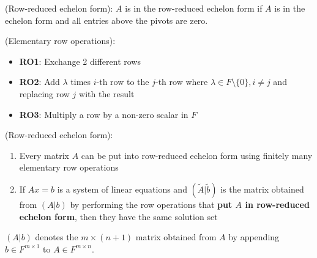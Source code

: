 \begin{definition}
(Row-reduced echelon form): $A$ is in the row-reduced echelon form if $A$ is in the echelon form and all entries above the pivots are zero.
\end{definition} 

\begin{definition}
(Elementary row operations): 
\begin{itemize}
    \item \textbf{RO1}: Exchange 2 different rows
    \item \textbf{RO2}: Add $\lambda$ times $i$-th row to the $j$-th row where $\lambda \in F  \setminus \{ 0 \}, i \neq j$  and replacing row $j$ with the result 
    \item \textbf{RO3}: Multiply a row by a non-zero scalar in $F$
\end{itemize} 
\end{definition}



\begin{theorem}
(Row-reduced echelon form):  
    \begin{enumerate}
        \item Every matrix $A$ can be put into row-reduced echelon form using finitely many elementary row operations
        \item If $Ax = b$ is a system of linear equations and $(\tilde{A} | \tilde{b})$ is the matrix obtained from $(A|b)$ by performing the row operations that \textbf{put $A$ in row-reduced echelon form}, then they have the same solution set
    \end{enumerate} 
\end{theorem} 

\begin{remark}
$(A |b)$ denotes the $m \times (n+1)$ matrix obtained from $A$ by appending $b \in F^{m \times 1}$ to $A \in F^{m \times n}$. 
\end{remark}

